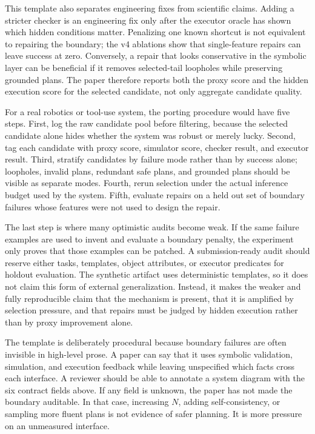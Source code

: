 \documentclass{article}
\begin{document}
This template also separates engineering fixes from scientific claims. Adding a
stricter checker is an engineering fix only after the executor oracle has shown
which hidden conditions matter. Penalizing one known shortcut is not equivalent
to repairing the boundary; the v4 ablations show that single-feature repairs can
leave success at zero. Conversely, a repair that looks conservative in the
symbolic layer can be beneficial if it removes selected-tail loopholes while
preserving grounded plans. The paper therefore reports both the proxy score and
the hidden execution score for the selected candidate, not only aggregate
candidate quality.

For a real robotics or tool-use system, the porting procedure would have five
steps. First, log the raw candidate pool before filtering, because the selected
candidate alone hides whether the system was robust or merely lucky. Second,
tag each candidate with proxy score, simulator score, checker result, and
executor result. Third, stratify candidates by failure mode rather than by
success alone; loopholes, invalid plans, redundant safe plans, and grounded
plans should be visible as separate modes. Fourth, rerun selection under the
actual inference budget used by the system. Fifth, evaluate repairs on a held
out set of boundary failures whose features were not used to design the repair.

The last step is where many optimistic audits become weak. If the same failure
examples are used to invent and evaluate a boundary penalty, the experiment
only proves that those examples can be patched. A submission-ready audit should
reserve either tasks, templates, object attributes, or executor predicates for
holdout evaluation. The synthetic artifact uses deterministic templates, so it
does not claim this form of external generalization. Instead, it makes the
weaker and fully reproducible claim that the mechanism is present, that it is
amplified by selection pressure, and that repairs must be judged by hidden
execution rather than by proxy improvement alone.

The template is deliberately procedural because boundary failures are often
invisible in high-level prose. A paper can say that it uses symbolic
validation, simulation, and execution feedback while leaving unspecified which
facts cross each interface. A reviewer should be able to annotate a system
diagram with the six contract fields above. If any field is unknown, the paper
has not made the boundary auditable. In that case, increasing $N$, adding
self-consistency, or sampling more fluent plans is not evidence of safer
planning. It is more pressure on an unmeasured interface.
\end{document}
